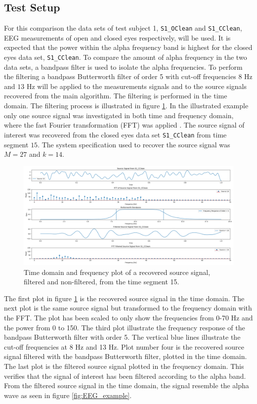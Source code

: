 \subsection{Test Setup}
For this comparison the data sets of test subject 1, \texttt{S1\_OClean} and \texttt{S1\_CClean}, EEG measurements of open and closed eyes respectively, will be used. 
It is expected that the power within the alpha frequency band is highest for the closed eyes data set, \texttt{S1\_CClean}.
To compare the amount of alpha frequency in the two data sets, a bandpass filter is used to isolate the alpha frequencies. 
To perform the filtering a bandpass Butterworth filter of order 5 with cut-off frequencies $8$ Hz and $13$ Hz will be applied to the measurements signals and to the source signals recovered from the main algorithm. 
The filtering is performed in the time domain. 
The filtering process is illustrated in figure \ref{fig:dft_1}.
In the illustrated example only one source signal was investigated in both time and frequency domain, where the fast Fourier transformation (FFT) was applied \cite[Chapter 9]{FFT}. 
The source signal of interest was recovered from the closed eyes data set \texttt{S1\_CClean} from time segment $15$. 
The system specification used to recover the source signal was $M = 27$ and $k = 14$.
\begin{figure}[H]
\centering
\includegraphics[scale=0.28]{figures/ch_7/DFT_plot_X_timeseg15_source10.png}
\caption{Time domain and frequency plot of a recovered source signal, filtered and non-filtered, from the time segment 15.}
\label{fig:dft_1}
\end{figure}
\noindent
The first plot in figure \ref{fig:dft_1} is the recovered source signal in the time domain. 
The next plot is the same source signal but transformed to the frequency domain with the FFT. 
The plot has been scaled to only show the frequencies from 0-70 Hz and the power from 0 to 150. 
The third plot illustrate the frequency response of the bandpass Butterworth filter with order 5. 
The vertical blue lines illustrate the cut-off frequencies at 8 Hz and 13 Hz.
Plot number four is the recovered source signal filtered with the bandpass Butterworth filter, plotted in the time domain. 
The last plot is the filtered source signal plotted in the frequency domain. 
This verifies that the signal of interest has been filtered according to the alpha band. 
From the filtered source signal in the time domain, the signal resemble the alpha wave as seen in figure \ref{fig:EEG_example}.

